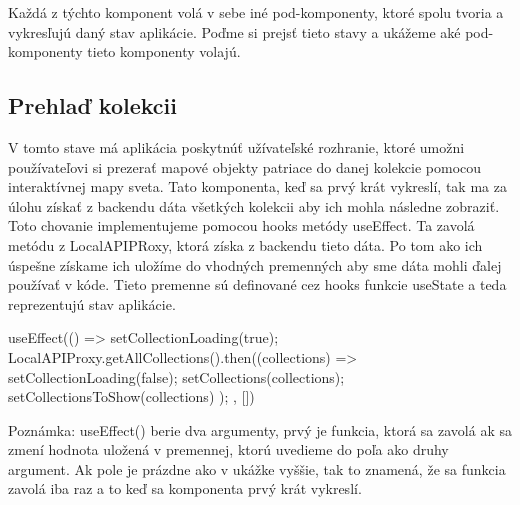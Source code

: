 Každá z týchto komponent volá v sebe iné pod-komponenty, ktoré spolu tvoria a vykresľujú daný stav aplikácie. 
Poďme si prejsť tieto stavy a ukážeme aké pod-komponenty tieto komponenty volajú. 

\subsection*{Prehlaď kolekcii}
V tomto stave má aplikácia poskytnúť užívateľské rozhranie, ktoré umožni používateľovi si prezerať mapové objekty patriace do danej kolekcie pomocou interaktívnej mapy sveta. 
Tato komponenta, keď sa prvý krát vykreslí, tak ma za úlohu získať z backendu dáta všetkých kolekcii aby ich mohla následne zobraziť. Toto chovanie implementujeme pomocou hooks metódy 
useEffect. Ta zavolá metódu z LocalAPIPRoxy, ktorá získa z backendu tieto dáta. Po tom ako ich úspešne získame ich uložíme do vhodných premenných aby sme dáta mohli ďalej používať v kóde. Tieto premenne sú definované cez hooks funkcie useState a teda reprezentujú stav aplikácie. 
\begin{code}
useEffect(() => {
      setCollectionLoading(true);
      LocalAPIProxy.getAllCollections().then((collections) => {
            setCollectionLoading(false);
            setCollections(collections);
            setCollectionsToShow(collections)
      }
      );
}, [])
\end{code}
Poznámka: useEffect() berie dva argumenty, prvý je funkcia, ktorá sa zavolá ak sa zmení hodnota uložená v premennej, ktorú uvedieme do poľa ako druhy argument. Ak pole je prázdne ako v ukážke vyššie, tak to znamená, že sa funkcia zavolá iba raz a to keď sa komponenta prvý krát vykreslí. 

